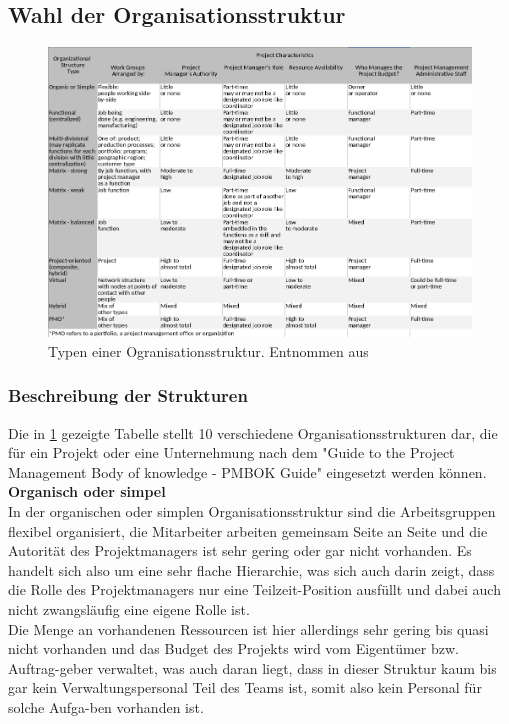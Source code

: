 \documentclass[ThesisDJ.tex]{subfiles}
\begin{document}
  \subsection{Wahl der Organisationsstruktur}

\begin{figure}[ht]
    \hspace{-0.5cm}
    \includegraphics[width=40pc]{./Organisationsstrukturen.png}
    \caption{Typen einer Ogranisationsstruktur. Entnommen aus\cite[S.~75]{PMI2017PMBOK}}
    \label{fig:orgstrukturen}
\end{figure} 

\subsubsection{Beschreibung der Strukturen}

Die in \ref{fig:orgstrukturen} gezeigte Tabelle stellt 10 verschiedene Organisationsstrukturen dar, die für ein Projekt oder eine Unternehmung nach dem "Guide to the Project Management Body of knowledge - PMBOK Guide" eingesetzt werden können.\cite{PMI2017PMBOK} \smallskip\\

\textbf{Organisch oder simpel}\\
In der organischen oder simplen Organisationsstruktur sind die Arbeitsgruppen flexibel organisiert, die Mitarbeiter arbeiten gemeinsam Seite an Seite und die Autorität des Projektmanagers ist sehr gering oder gar nicht vorhanden. Es handelt sich also um eine sehr flache Hierarchie, was sich auch darin zeigt, dass die Rolle des Projektmanagers nur eine Teilzeit-Position ausfüllt und dabei auch nicht zwangsläufig eine eigene Rolle ist.\\
Die Menge an vorhandenen Ressourcen ist hier allerdings sehr gering bis quasi nicht vorhanden und das Budget des Projekts wird vom Eigentümer bzw. Auftrag-geber verwaltet, was auch daran liegt, dass in dieser Struktur kaum bis gar kein Verwaltungspersonal Teil des Teams ist, somit also kein Personal für solche Aufga-ben vorhanden ist. \medskip\\
\end{document}
